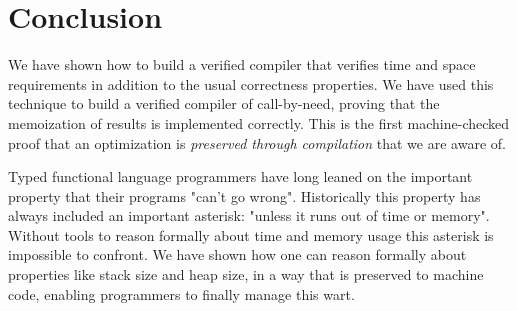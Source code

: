 \section{Conclusion} \label{sec:conclusion}

We have shown how to build a verified compiler that verifies time and space
requirements in addition to the usual correctness properties. We have used this
technique to build a verified compiler of call-by-need, proving that the
memoization of results is implemented correctly. This is the first
machine-checked proof that an optimization is \emph{preserved through
compilation} that we are aware of. 

Typed functional language programmers have long leaned on the important property
that their programs "can't go wrong". Historically this property has always
included an important asterisk: "unless it runs out of time or memory". Without
tools to reason formally about time and memory usage this asterisk is impossible
to confront. We have shown how one can reason formally about properties like
stack size and heap size, in a way that is preserved to machine code, enabling
programmers to finally manage this wart.


